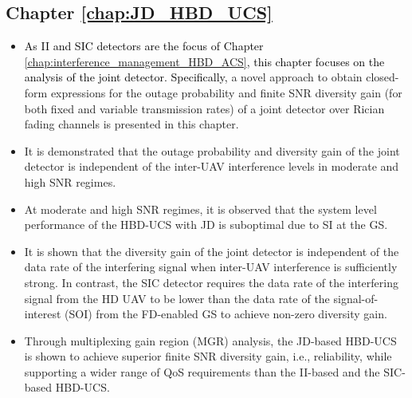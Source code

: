\subsection{Chapter \ref{chap:JD_HBD_UCS}}
\begin{itemize}
\item \textcolor{black}{As II and SIC detectors are the focus of Chapter \ref{chap:interference_management_HBD_ACS}, this chapter focuses on the analysis of the joint detector. Specifically,} a novel approach to obtain closed-form expressions for the outage probability and finite SNR diversity gain (for both fixed and variable transmission rates) of a joint detector over Rician fading channels is presented in this chapter.

\item It is demonstrated that the outage probability and diversity gain of the joint detector is independent of the inter-UAV interference levels in moderate and high SNR regimes.

\item At moderate and high SNR regimes, it is observed that the system level performance of the HBD-UCS with JD is suboptimal due to SI at the GS.

\item It is shown that the diversity gain of the joint detector is independent of the data rate of the interfering signal when inter-UAV interference is sufficiently strong. In contrast, the SIC detector requires the data rate of the interfering signal from the HD UAV to be lower than the data rate of the signal-of-interest (SOI) from the FD-enabled GS to achieve non-zero diversity gain.

\item Through multiplexing gain region (MGR) analysis, the JD-based HBD-UCS is shown to achieve superior finite SNR diversity gain, i.e., reliability, while supporting a wider range of QoS requirements than the II-based and the SIC-based HBD-UCS.
\end{itemize}

